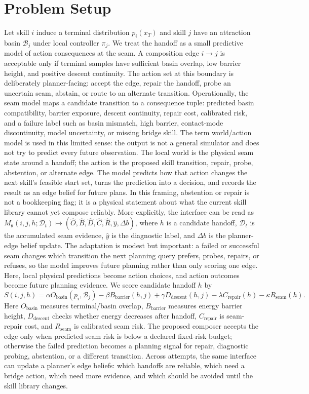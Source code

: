 \documentclass{article}
\begin{document}
\section{Problem Setup}
Let skill $i$ induce a terminal distribution $p_i(x_T)$ and skill $j$ have an attraction basin $\mathcal{B}_j$ under local controller $\pi_j$. We treat the handoff as a small predictive model of action consequences at the seam. A composition edge $i\rightarrow j$ is acceptable only if terminal samples have sufficient basin overlap, low barrier height, and positive descent continuity. The action set at this boundary is deliberately planner-facing: accept the edge, repair the handoff, probe an uncertain seam, abstain, or route to an alternate transition.
Operationally, the seam model maps a candidate transition to a consequence tuple: predicted basin compatibility, barrier exposure, descent continuity, repair cost, calibrated risk, and a failure label such as basin mismatch, high barrier, contact-mode discontinuity, model uncertainty, or missing bridge skill. The term world/action model is used in this limited sense: the output is not a general simulator and does not try to predict every future observation. The local world is the physical seam state around a handoff; the action is the proposed skill transition, repair, probe, abstention, or alternate edge. The model predicts how that action changes the next skill's feasible start set, turns the prediction into a decision, and records the result as an edge belief for future plans. In this framing, abstention or repair is not a bookkeeping flag; it is a physical statement about what the current skill library cannot yet compose reliably.
More explicitly, the interface can be read as $M_\theta(i,j,h;\mathcal{D}_t)\mapsto(\widehat O,\widehat B,\widehat D,\widehat C,\widehat R,\widehat y,\Delta b)$, where $h$ is a candidate handoff, $\mathcal{D}_t$ is the accumulated seam evidence, $\widehat y$ is the diagnostic label, and $\Delta b$ is the planner-edge belief update. The adaptation is modest but important: a failed or successful seam changes which transition the next planning query prefers, probes, repairs, or refuses, so the model improves future planning rather than only scoring one edge. Here, local physical predictions become action choices, and action outcomes become future planning evidence.
We score candidate handoff $h$ by
\[
S(i,j,h)=\alpha O_{\mathrm{basin}}(p_i,\mathcal{B}_j)-\beta B_{\mathrm{barrier}}(h,j)+\gamma D_{\mathrm{descent}}(h,j)-\lambda C_{\mathrm{repair}}(h)-\kappa R_{\mathrm{seam}}(h).
\]
Here $O_{\mathrm{basin}}$ measures terminal/basin overlap, $B_{\mathrm{barrier}}$ measures energy barrier height, $D_{\mathrm{descent}}$ checks whether energy decreases after handoff, $C_{\mathrm{repair}}$ is seam-repair cost, and $R_{\mathrm{seam}}$ is calibrated seam risk. The proposed composer accepts the edge only when predicted seam risk is below a declared fixed-risk budget; otherwise the failed prediction becomes a planning signal for repair, diagnostic probing, abstention, or a different transition. Across attempts, the same interface can update a planner's edge beliefs: which handoffs are reliable, which need a bridge action, which need more evidence, and which should be avoided until the skill library changes.
\end{document}
